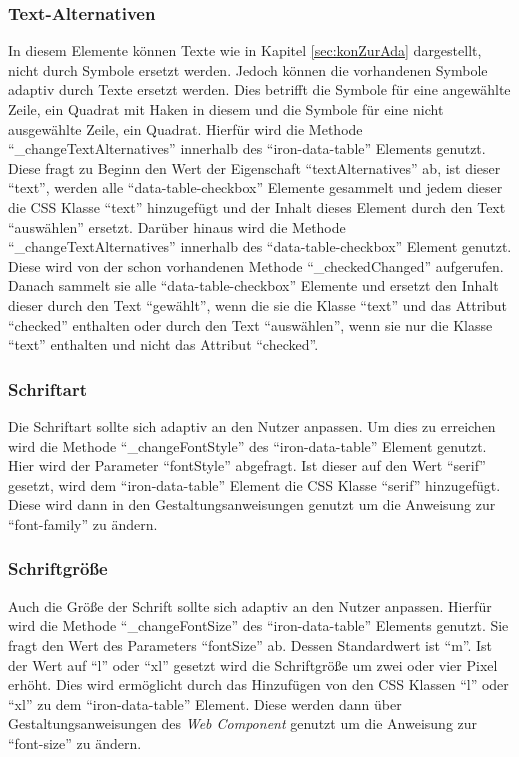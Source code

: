 \documentclass[12pt, paper=a4, bibtotoc, toc=listof, headsepline=true]{scrreprt}
\begin{document}
	\subsubsection{Text-Alternativen}
	In diesem Elemente können Texte wie in Kapitel \ref{sec:konZurAda} dargestellt, nicht durch Symbole ersetzt werden. Jedoch können die vorhandenen Symbole adaptiv durch Texte ersetzt werden. Dies betrifft die Symbole für eine angewählte Zeile, ein Quadrat mit Haken in diesem und die Symbole für eine nicht ausgewählte Zeile, ein Quadrat. Hierfür wird die Methode \enquote{\_changeTextAlternatives} innerhalb des \enquote{iron-data-table} Elements genutzt. Diese fragt zu Beginn den Wert der Eigenschaft \enquote{textAlternatives} ab, ist dieser \enquote{text}, werden alle \enquote{data-table-checkbox} Elemente gesammelt und jedem dieser die CSS Klasse \enquote{text} hinzugefügt und der Inhalt dieses Element durch den Text \enquote{auswählen} ersetzt. Darüber hinaus wird die Methode \enquote{\_changeTextAlternatives} innerhalb des \enquote{data-table-checkbox} Element genutzt. Diese wird von der schon vorhandenen Methode \enquote{\_checkedChanged} aufgerufen. Danach sammelt sie alle \enquote{data-table-checkbox} Elemente und ersetzt den Inhalt dieser durch den Text \enquote{gewählt}, wenn die sie die Klasse \enquote{text} und das Attribut \enquote{checked} enthalten oder durch den Text \enquote{auswählen}, wenn sie nur die Klasse \enquote{text} enthalten und nicht das Attribut \enquote{checked}.
	\subsubsection{Schriftart}
	Die Schriftart sollte sich adaptiv an den Nutzer anpassen. Um dies zu erreichen wird die Methode \enquote{\_changeFontStyle} des \enquote{iron-data-table} Element genutzt. Hier wird der Parameter \enquote{fontStyle} abgefragt. Ist dieser auf den Wert \enquote{serif} gesetzt, wird dem \enquote{iron-data-table} Element die CSS Klasse \enquote{serif} hinzugefügt. Diese wird dann in den Gestaltungsanweisungen genutzt um die Anweisung zur \enquote{font-family} zu ändern.
	\subsubsection{Schriftgröße}
	Auch die Größe der Schrift sollte sich adaptiv an den Nutzer anpassen. Hierfür wird die Methode \enquote{\_changeFontSize} des \enquote{iron-data-table} Elements genutzt. Sie fragt den Wert des Parameters \enquote{fontSize} ab. Dessen Standardwert ist \enquote{m}. Ist der Wert auf \enquote{l} oder \enquote{xl} gesetzt wird die Schriftgröße um zwei oder vier Pixel erhöht. Dies wird ermöglicht durch das Hinzufügen von den CSS Klassen \enquote{l} oder \enquote{xl} zu dem \enquote{iron-data-table} Element. Diese werden dann über Gestaltungsanweisungen des \emph{Web Component} genutzt um die Anweisung zur \enquote{font-size} zu ändern.
\end{document}
